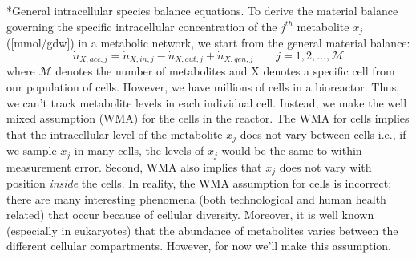 \documentclass[11pt]{article}
\makeatletter
\theoremstyle{definition}
\renewcommand\subsection{\@startsection
	{subsection}{2}{0mm}
	{-0.05in}
	{-0.5\baselineskip}
	{\normalfont\normalsize\bfseries}}
\makeatother
\begin{document}
\subsection*{General intracellular species balance equations.}
To derive the material balance governing the specific intracellular concentration of the $j^{th}$ metabolite $x_{j}$ ([mmol/gdw]) in a metabolic network,
we start from the general material balance:
\begin{equation}\label{eqn:general-balances}
\dot{n}_{X,acc,j} = \dot{n}_{X,in,j} - \dot{n}_{X,out,j} + \dot{n}_{X,gen,j}\qquad{j=1,2,\hdots,\mathcal{M}}
\end{equation}where $\mathcal{M}$ denotes the number of metabolites and X denotes a specific cell from our population of cells.
However, we have millions of cells in a bioreactor. Thus, we can't track metabolite levels in each individual cell.
Instead, we make the well mixed assumption (WMA) for the cells in the reactor. The WMA for cells implies that
the intracellular level of the metabolite $x_{j}$ does not vary between cells i.e., if we sample $x_{j}$ in many cells, the levels of $x_{j}$ would
be the same to within measurement error. Second, WMA also implies that $x_{j}$ does not vary with position \emph{inside} the cells.
In reality, the WMA assumption for cells is incorrect;
there are many interesting phenomena (both technological and human health related) that occur because of cellular diversity.
Moreover, it is well known (especially in eukaryotes) that the abundance of metabolites varies between the different cellular compartments.
However, for now we'll make this assumption.
\end{document}
